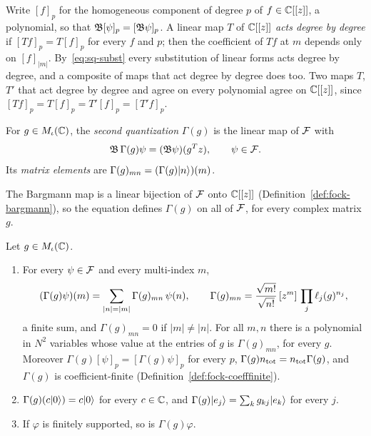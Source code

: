 \begin{vetdenv}
Write $[f]_p$ for the homogeneous component of degree $p$ of $f\in\mathbb C[[z]]$, a polynomial, so that
$\mathfrak B[\psi]_p=[\mathfrak B\psi]_p$. A linear map $T$ of $\mathbb C[[z]]$ \emph{acts degree by degree} if $[Tf]_p=T[f]_p$ for every
$f$ and $p$; then the coefficient of $Tf$ at $m$ depends only on $[f]_{\lvert m\rvert}$. By~\eqref{eq:sq-subst} every
substitution of linear forms acts degree by degree, and a composite of maps that act degree by degree does too. Two
maps $T$, $T'$ that act degree by degree and agree on every polynomial agree on $\mathbb C[[z]]$, since
$[Tf]_p=T[f]_p=T'[f]_p=[T'f]_p$.

\begin{definition}\label{def:sq-gamma}
For $g\in M_\iota(\mathbb C)$, the \emph{second quantization} $\Gamma(g)$ is the linear map of $\mathcal F$ with
\[
 \mathfrak B\,\Gamma(g)\psi=(\mathfrak B\psi)(g^Tz),\qquad\psi\in\mathcal F .
\]
Its \emph{matrix elements} are $\Gamma(g)_{mn}=(\Gamma(g)\lvert n\rangle)(m)$.
\end{definition}

The Bargmann map is a linear bijection of $\mathcal F$ onto $\mathbb C[[z]]$ (Definition~\ref{def:fock-bargmann}), so the
equation defines $\Gamma(g)$ on all of $\mathcal F$, for every complex matrix $g$.

\begin{lemma}\label{lem:sq-sectors}
Let $g\in M_\iota(\mathbb C)$.
\begin{enumerate}
\item[(a)] For every $\psi\in\mathcal F$ and every multi-index $m$,
\[
 (\Gamma(g)\psi)(m)=\sum_{\lvert n\rvert=\lvert m\rvert}\Gamma(g)_{mn}\,\psi(n),\qquad
 \Gamma(g)_{mn}=\frac{\sqrt{m!}}{\sqrt{n!}}\,[z^{m}]\,\prod_j\ell_j(g)^{n_j},
\]
a finite sum, and $\Gamma(g)_{mn}=0$ if $\lvert m\rvert\ne\lvert n\rvert$. For all $m,n$ there is a polynomial in
$N^2$ variables whose value at the entries of $g$ is $\Gamma(g)_{mn}$, for every $g$. Moreover
$\Gamma(g)[\psi]_p=[\Gamma(g)\psi]_p$ for every $p$, $\Gamma(g)n_{\mathrm{tot}}=n_{\mathrm{tot}}\Gamma(g)$, and $\Gamma(g)$ is
coefficient-finite (Definition~\ref{def:fock-coefffinite}).
\item[(b)] $\Gamma(g)(c\lvert 0\rangle)=c\lvert 0\rangle$ for every $c\in\mathbb C$, and $\Gamma(g)\lvert e_j\rangle=\sum_kg_{kj}\lvert e_k\rangle$ for every $j$.
\item[(c)] If $\varphi$ is finitely supported, so is $\Gamma(g)\varphi$.
\end{enumerate}
\end{lemma}


\end{vetdenv}
